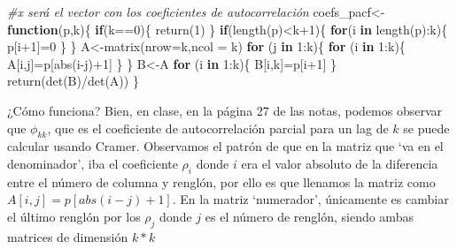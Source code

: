 \documentclass[
]{article}
\newenvironment{Shaded}{\begin{snugshade}}{\end{snugshade}}
\newcommand{\AttributeTok}[1]{\textcolor[rgb]{0.77,0.63,0.00}{#1}}
\newcommand{\CommentTok}[1]{\textcolor[rgb]{0.56,0.35,0.01}{\textit{#1}}}
\newcommand{\ControlFlowTok}[1]{\textcolor[rgb]{0.13,0.29,0.53}{\textbf{#1}}}
\newcommand{\DecValTok}[1]{\textcolor[rgb]{0.00,0.00,0.81}{#1}}
\newcommand{\FunctionTok}[1]{\textcolor[rgb]{0.00,0.00,0.00}{#1}}
\newcommand{\NormalTok}[1]{#1}
\newcommand{\OtherTok}[1]{\textcolor[rgb]{0.56,0.35,0.01}{#1}}
\newcommand{\SpecialCharTok}[1]{\textcolor[rgb]{0.00,0.00,0.00}{#1}}
\begin{document}
\begin{Shaded}
\begin{Highlighting}[]
\CommentTok{\#x será el vector con los coeficientes de autocorrelación}
\NormalTok{coefs\_pacf}\OtherTok{\textless{}{-}}\ControlFlowTok{function}\NormalTok{(p,k)\{}
  \ControlFlowTok{if}\NormalTok{(k}\SpecialCharTok{==}\DecValTok{0}\NormalTok{)\{}
    \FunctionTok{return}\NormalTok{(}\DecValTok{1}\NormalTok{)}
\NormalTok{  \}}
  \ControlFlowTok{if}\NormalTok{(}\FunctionTok{length}\NormalTok{(p)}\SpecialCharTok{\textless{}}\NormalTok{k}\SpecialCharTok{+}\DecValTok{1}\NormalTok{)\{}
    \ControlFlowTok{for}\NormalTok{(i }\ControlFlowTok{in} \FunctionTok{length}\NormalTok{(p)}\SpecialCharTok{:}\NormalTok{k)\{}
\NormalTok{      p[i}\SpecialCharTok{+}\DecValTok{1}\NormalTok{]}\OtherTok{=}\DecValTok{0}
\NormalTok{    \}}
\NormalTok{  \}}
\NormalTok{  A}\OtherTok{\textless{}{-}}\FunctionTok{matrix}\NormalTok{(}\AttributeTok{nrow=}\NormalTok{k,}\AttributeTok{ncol =}\NormalTok{ k)}
  \ControlFlowTok{for}\NormalTok{ (j }\ControlFlowTok{in} \DecValTok{1}\SpecialCharTok{:}\NormalTok{k)\{}
    \ControlFlowTok{for}\NormalTok{ (i }\ControlFlowTok{in} \DecValTok{1}\SpecialCharTok{:}\NormalTok{k)\{}
\NormalTok{       A[i,j]}\OtherTok{=}\NormalTok{p[}\FunctionTok{abs}\NormalTok{(i}\SpecialCharTok{{-}}\NormalTok{j)}\SpecialCharTok{+}\DecValTok{1}\NormalTok{]}
\NormalTok{    \}}
\NormalTok{  \}}
\NormalTok{  B}\OtherTok{\textless{}{-}}\NormalTok{A}
  \ControlFlowTok{for}\NormalTok{ (i }\ControlFlowTok{in} \DecValTok{1}\SpecialCharTok{:}\NormalTok{k)\{}
\NormalTok{    B[i,k]}\OtherTok{=}\NormalTok{p[i}\SpecialCharTok{+}\DecValTok{1}\NormalTok{]}
\NormalTok{  \}}
  \FunctionTok{return}\NormalTok{(}\FunctionTok{det}\NormalTok{(B)}\SpecialCharTok{/}\FunctionTok{det}\NormalTok{(A))}
\NormalTok{\}}
\end{Highlighting}
\end{Shaded}

¿Cómo funciona? Bien, en clase, en la página 27 de las notas, podemos
observar que \(\phi_{kk}\), que es el coeficiente de autocorrelación
parcial para un lag de \(k\) se puede calcular usando Cramer. Observamos
el patrón de que en la matriz que `va en el denominador', iba el
coeficiente \(\rho_{i}\) donde \(i\) era el valor absoluto de la
diferencia entre el número de columna y renglón, por ello es que
llenamos la matriz como \(A[i,j]=p[abs(i-j)+1]\). En la matriz
`numerador', únicamente es cambiar el último renglón por los \(\rho_j\)
donde \(j\) es el número de renglón, siendo ambas matrices de dimensión
\(k*k\)
\end{document}
